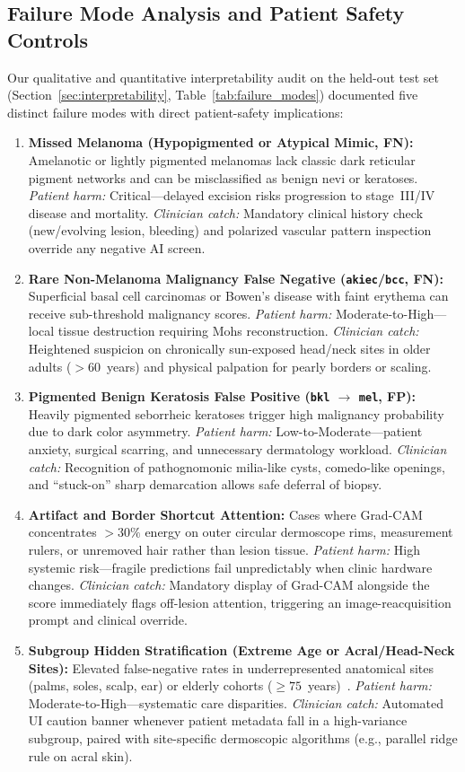 \subsection{Failure Mode Analysis and Patient Safety Controls}
Our qualitative and quantitative interpretability audit on the held-out test set (Section~\ref{sec:interpretability}, Table~\ref{tab:failure_modes}) documented five distinct failure modes with direct patient-safety implications:
\begin{enumerate}
  \item \textbf{Missed Melanoma (Hypopigmented or Atypical Mimic, FN):} Amelanotic or lightly pigmented melanomas lack classic dark reticular pigment networks and can be misclassified as benign nevi or keratoses. \emph{Patient harm:} Critical—delayed excision risks progression to stage~III/IV disease and mortality. \emph{Clinician catch:} Mandatory clinical history check (new/evolving lesion, bleeding) and polarized vascular pattern inspection override any negative AI screen.
  \item \textbf{Rare Non-Melanoma Malignancy False Negative (\texttt{akiec}/\texttt{bcc}, FN):} Superficial basal cell carcinomas or Bowen's disease with faint erythema can receive sub-threshold malignancy scores. \emph{Patient harm:} Moderate-to-High—local tissue destruction requiring Mohs reconstruction. \emph{Clinician catch:} Heightened suspicion on chronically sun-exposed head/neck sites in older adults ($>60$~years) and physical palpation for pearly borders or scaling.
  \item \textbf{Pigmented Benign Keratosis False Positive (\texttt{bkl} $\to$ \texttt{mel}, FP):} Heavily pigmented seborrheic keratoses trigger high malignancy probability due to dark color asymmetry. \emph{Patient harm:} Low-to-Moderate—patient anxiety, surgical scarring, and unnecessary dermatology workload. \emph{Clinician catch:} Recognition of pathognomonic milia-like cysts, comedo-like openings, and ``stuck-on'' sharp demarcation allows safe deferral of biopsy.
  \item \textbf{Artifact and Border Shortcut Attention:} Cases where Grad-CAM concentrates $>30\%$ energy on outer circular dermoscope rims, measurement rulers, or unremoved hair rather than lesion tissue. \emph{Patient harm:} High systemic risk—fragile predictions fail unpredictably when clinic hardware changes. \emph{Clinician catch:} Mandatory display of Grad-CAM alongside the score immediately flags off-lesion attention, triggering an image-reacquisition prompt and clinical override.
  \item \textbf{Subgroup Hidden Stratification (Extreme Age or Acral/Head-Neck Sites):} Elevated false-negative rates in underrepresented anatomical sites (palms, soles, scalp, ear) or elderly cohorts ($\ge 75$~years)~\cite{OakdenRayner2020hidden}. \emph{Patient harm:} Moderate-to-High—systematic care disparities. \emph{Clinician catch:} Automated UI caution banner whenever patient metadata fall in a high-variance subgroup, paired with site-specific dermoscopic algorithms (e.g., parallel ridge rule on acral skin).
\end{enumerate}


